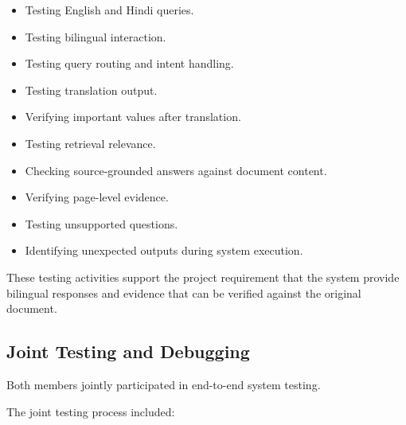 \begin{itemize}

    \item Testing English and Hindi queries.

    \item Testing bilingual interaction.

    \item Testing query routing and intent handling.

    \item Testing translation output.

    \item Verifying important values after translation.

    \item Testing retrieval relevance.

    \item Checking source-grounded answers against document content.

    \item Verifying page-level evidence.

    \item Testing unsupported questions.

    \item Identifying unexpected outputs during system execution.

\end{itemize}

These testing activities support the project requirement that the
system provide bilingual responses and evidence that can be verified
against the original document.

\subsection{Joint Testing and Debugging}

Both members jointly participated in end-to-end system testing.

The joint testing process included:

